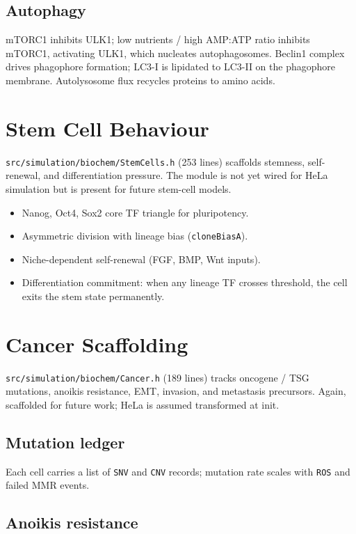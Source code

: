 \documentclass[11pt,letterpaper,twoside,openany]{book}
\newcommand{\code}[1]{\texttt{#1}}
\newcommand{\file}[1]{\texttt{\small#1}}
\begin{document}
\section{Autophagy}

mTORC1 inhibits ULK1; low nutrients / high AMP:ATP ratio inhibits
mTORC1, activating ULK1, which nucleates autophagosomes. Beclin1
complex drives phagophore formation; LC3-I is lipidated to LC3-II
on the phagophore membrane. Autolysosome flux recycles proteins to
amino acids.

\chapter{Stem Cell Behaviour}
\label{ch:stem}

\file{src/simulation/biochem/StemCells.h} (253 lines) scaffolds
stemness, self-renewal, and differentiation pressure. The module is
not yet wired for HeLa simulation but is present for future
stem-cell models.

\begin{itemize}
  \item Nanog, Oct4, Sox2 core TF triangle for pluripotency.
  \item Asymmetric division with lineage bias (\code{cloneBiasA}).
  \item Niche-dependent self-renewal (FGF, BMP, Wnt inputs).
  \item Differentiation commitment: when any lineage TF crosses
        threshold, the cell exits the stem state permanently.
\end{itemize}

\chapter{Cancer Scaffolding}
\label{ch:cancer}

\file{src/simulation/biochem/Cancer.h} (189 lines) tracks oncogene /
TSG mutations, anoikis resistance, EMT, invasion, and metastasis
precursors. Again, scaffolded for future work; HeLa is assumed
transformed at init.

\section{Mutation ledger}

Each cell carries a list of \code{SNV} and \code{CNV} records;
mutation rate scales with \code{ROS} and failed MMR events.

\section{Anoikis resistance}
\end{document}
